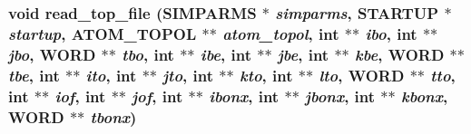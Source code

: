 \subsubsection{\setlength{\rightskip}{0pt plus 5cm}void read\_\-top\_\-file ({\bf SIMPARMS} $\ast$ {\em simparms}, {\bf STARTUP} $\ast$ {\em startup}, {\bf ATOM\_\-TOPOL} $\ast$$\ast$ {\em atom\_\-topol}, int $\ast$$\ast$ {\em ibo}, int $\ast$$\ast$ {\em jbo}, {\bf WORD} $\ast$$\ast$ {\em tbo}, int $\ast$$\ast$ {\em ibe}, int $\ast$$\ast$ {\em jbe}, int $\ast$$\ast$ {\em kbe}, {\bf WORD} $\ast$$\ast$ {\em tbe}, int $\ast$$\ast$ {\em ito}, int $\ast$$\ast$ {\em jto}, int $\ast$$\ast$ {\em kto}, int $\ast$$\ast$ {\em lto}, {\bf WORD} $\ast$$\ast$ {\em tto}, int $\ast$$\ast$ {\em iof}, int $\ast$$\ast$ {\em jof}, int $\ast$$\ast$ {\em ibonx}, int $\ast$$\ast$ {\em jbonx}, int $\ast$$\ast$ {\em kbonx}, {\bf WORD} $\ast$$\ast$ {\em tbonx})}\label{thomas_2md__readparm_8c_d155a8321e08ef8c4843b66739c0de29}


